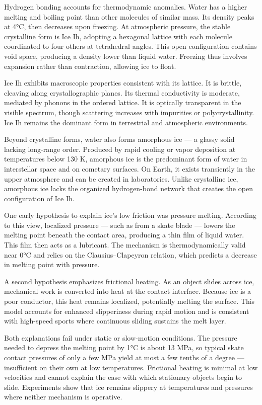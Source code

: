 Hydrogen bonding accounts for thermodynamic anomalies. Water has a higher melting and boiling point than other molecules of similar mass. Its density peaks at 4°C, then decreases upon freezing. At atmospheric pressure, the stable crystalline form is Ice Ih, adopting a hexagonal lattice with each molecule coordinated to four others at tetrahedral angles. This open configuration contains void space, producing a density lower than liquid water. Freezing thus involves expansion rather than contraction, allowing ice to float.

Ice Ih exhibits macroscopic properties consistent with its lattice. It is brittle, cleaving along crystallographic planes. Its thermal conductivity is moderate, mediated by phonons in the ordered lattice. It is optically transparent in the visible spectrum, though scattering increases with impurities or polycrystallinity. Ice Ih remains the dominant form in terrestrial and atmospheric environments.

Beyond crystalline forms, water also forms amorphous ice — a glassy solid lacking long-range order. Produced by rapid cooling or vapor deposition at temperatures below 130 K, amorphous ice is the predominant form of water in interstellar space and on cometary surfaces. On Earth, it exists transiently in the upper atmosphere and can be created in laboratories. Unlike crystalline ice, amorphous ice lacks the organized hydrogen-bond network that creates the open configuration of Ice Ih.

One early hypothesis to explain ice's low friction was pressure melting. According to this view, localized pressure — such as from a skate blade — lowers the melting point beneath the contact area, producing a thin film of liquid water. This film then acts as a lubricant. The mechanism is thermodynamically valid near 0°C and relies on the Clausius–Clapeyron relation, which predicts a decrease in melting point with pressure.

A second hypothesis emphasizes frictional heating. As an object slides across ice, mechanical work is converted into heat at the contact interface. Because ice is a poor conductor, this heat remains localized, potentially melting the surface. This model accounts for enhanced slipperiness during rapid motion and is consistent with high-speed sports where continuous sliding sustains the melt layer.

Both explanations fail under static or slow-motion conditions. The pressure needed to depress the melting point by 1°C is about 13 MPa, so typical skate contact pressures of only a few MPa yield at most a few tenths of a degree — insufficient on their own at low temperatures. Frictional heating is minimal at low velocities and cannot explain the ease with which stationary objects begin to slide. Experiments show that ice remains slippery at temperatures and pressures where neither mechanism is operative.

